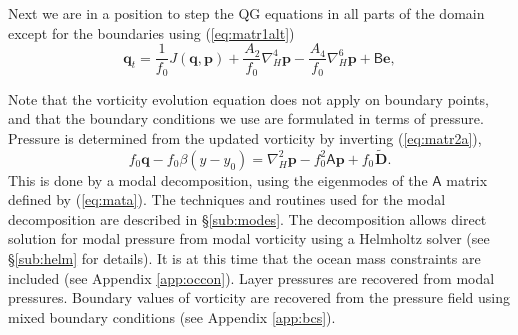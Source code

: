\documentclass[11pt, a4paper,twoside]{article}
\newcommand{\at}[1]{{{}^{#1}A_2}}
\newcommand{\ah}[1]{{{}^{#1}A_4}}
\newcommand{\vc}[1]{\mathbf{#1}}
\newcommand{\mtx}[1]{\vc{\mathsf{#1}}}
\newcommand{\Dt}[1]{\vc{{}^{#1}\tilde{D}}}
\numberwithin{equation}{section}
\begin{document}
Next we are in a position to step the QG equations in all parts of the domain except for the boundaries using (\ref{eq:matr1alt})
\begin{equation}\label{eq:matr1b}
\vc{q}_t  = \frac{1}{f_0}J(\vc{q},\vc{p}) + \frac{\at{}}{f_0}\nabla_H^4 \vc{p} - \frac{\ah{}}{f_0}\nabla_H^6 \vc{p} + \mtx{B}\vc{e} ,
\end{equation}

Note that the vorticity evolution equation does not apply on boundary points, and that the boundary conditions we use are formulated in terms of pressure.
Pressure is determined from the updated vorticity by inverting (\ref{eq:matr2a}),
\begin{equation}\label{eq:matr2b}
f_0 \vc{q} - f_0 \beta(y-y_0) =  \nabla_H^2 \vc{p}  - f_0^2 \mtx{A}\vc{p} + f_0\Dt{}.
\end{equation}
This is done by a modal decomposition, using the eigenmodes of the $\mtx{A}$ matrix defined by (\ref{eq:mata}). 
The techniques and routines used for the modal decomposition are described in \S\ref{sub:modes}.
The decomposition allows direct solution for modal pressure from modal vorticity using a Helmholtz solver (see \S\ref{sub:helm} for details).
It is at this time that the ocean mass constraints are included (see Appendix \ref{app:occon}).
Layer pressures are recovered from modal pressures.
Boundary values of vorticity are recovered from the pressure field using mixed boundary conditions (see Appendix \ref{app:bcs}).
\end{document}
